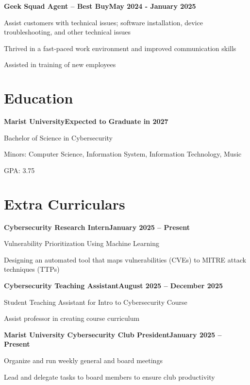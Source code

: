 \documentclass[letterpaper,10pt]{article}
\newcommand{\heading}[2]{
  \hspace{10pt}#1\hfill#2\\
}
\newcommand{\headingBf}[2]{
  \heading{\textbf{#1}}{\textbf{#2}}
}
\newenvironment{resume_list}{
  \vspace{-7pt}
  \begin{itemize}[itemsep=-2px, parsep=1pt, leftmargin=30pt]
}{
  \end{itemize}
}
\begin{document}
\headingBf{Geek Squad Agent -- Best Buy}{May 2024 - January 2025}
\begin{resume_list}
  \item Assist customers with technical issues; software installation, device troubleshooting, and other technical issues
  \item Thrived in a fast-paced work environment and improved communication skills
  \item Assisted in training of new employees
\end{resume_list}

\section{Education}

\headingBf{Marist University}{Expected to Graduate in 2027} 
\begin{resume_list}
  \item Bachelor of Science in Cybersecurity
  \item Minors: Computer Science, Information System, Information Technology, Music
  \item GPA: 3.75
\end{resume_list}

\section{Extra Curriculars}

\headingBf{Cybersecurity Research Intern}{January 2025 -- Present}
\begin{resume_list}
  \item Vulnerability Prioritization Using Machine Learning 
  \item Designing an automated tool that maps vulnerabilities (CVEs) to MITRE attack techniques (TTPs)
\end{resume_list}

\headingBf{Cybersecurity Teaching Assistant}{August 2025 -- December 2025}
\begin{resume_list}
  \item Student Teaching Assistant for Intro to Cybersecurity Course
  \item Assist professor in creating course curriculum
\end{resume_list}

\headingBf{Marist University Cybersecurity Club President}{January 2025 -- Present}
\begin{resume_list}
  \item Organize and run weekly general and board meetings
  \item Lead and delegate tasks to board members to ensure club productivity
\end{resume_list}
\end{document}
